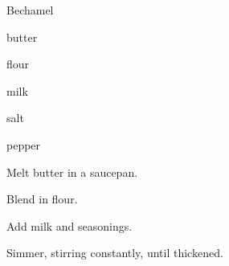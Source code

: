 \begin{recipe}{Bechamel}{}{}

\begin{ingredients}
\item {} butter
\item {} flour
\item {} milk
\item salt
\item pepper
\end{ingredients}

\begin{directions}
\item Melt butter in a saucepan.
\item Blend in flour.
\item Add milk and seasonings.
\item Simmer, stirring constantly, until thickened.
\end{directions}

\end{recipe}
